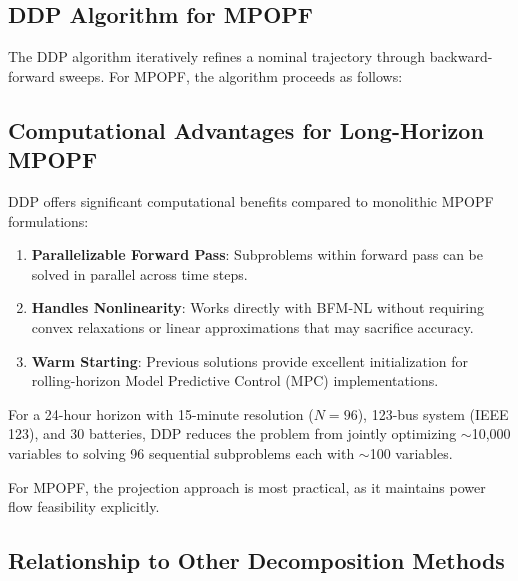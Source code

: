 \subsection{DDP Algorithm for MPOPF}

The DDP algorithm iteratively refines a nominal trajectory through backward-forward sweeps. For MPOPF, the algorithm proceeds as follows:

\subsection{Computational Advantages for Long-Horizon MPOPF}

DDP offers significant computational benefits compared to monolithic MPOPF formulations:

\begin{enumerate}        
    \item \textbf{Parallelizable Forward Pass}: Subproblems within forward pass can be solved in parallel across time steps.
    
    \item \textbf{Handles Nonlinearity}: Works directly with BFM-NL \cite{Farivar1} without requiring convex relaxations or linear approximations that may sacrifice accuracy.
    
    \item \textbf{Warm Starting}: Previous solutions provide excellent initialization for rolling-horizon Model Predictive Control (MPC) implementations.
\end{enumerate}

For a 24-hour horizon with 15-minute resolution ($N=96$), 123-bus system (IEEE 123), and 30 batteries, DDP reduces the problem from jointly optimizing $\sim$10,000 variables to solving 96 sequential subproblems each with $\sim$100 variables.


For MPOPF, the projection approach is most practical, as it maintains power flow feasibility explicitly.

\subsection{Relationship to Other Decomposition Methods}

